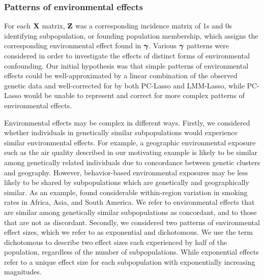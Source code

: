 \subsubsection{Patterns of environmental effects}

For each $\textbf{X}$ matrix, $\textbf{Z}$ was a corresponding incidence matrix of 1s and 0s identifying subpopulation, or founding population membership, which assigns the corresponding environmental effect found in $\boldsymbol{\gamma}$. Various $\boldsymbol{\gamma}$ patterns were considered in order to investigate the effects of distinct forms of environmental confounding. Our initial hypothesis was that simple patterns of environmental effects could be well-approximated by a linear combination of the observed genetic data and well-corrected for by both PC-Lasso and LMM-Lasso, while PC-Lasso would be unable to represent and correct for more complex patterns of environmental effects.

Environmental effects may be complex in different ways. Firstly, we considered whether individuals in genetically similar subpopulations would experience similar environmental effects. For example, a geographic environmental exposure such as the air quality described in our motivating example is likely to be similar among genetically related individuals due to concordance between genetic clusters and geography. However, behavior-based environmental exposures may be less likely to be shared by subpopulations which are genetically and geographically similar. As an example, \citet{ng2014smoking} found considerable within-region variation in smoking rates in Africa, Asia, and South America. We refer to environmental effects that are similar among genetically similar subpopulations as concordant, and to those that are not as discordant. Secondly, we considered two patterns of environmental effect sizes, which we refer to as exponential and dichotomous. We use the term dichotomous to describe two effect sizes each experienced by half of the population, regardless of the number of subpopulations. While exponential effects refer to a unique effect size for each subpopulation with exponentially increasing magnitudes. 

